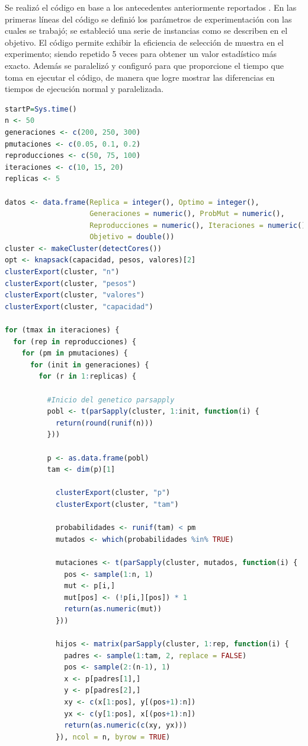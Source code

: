 \documentclass[12pt, letterpaper] {article}
\begin{document}
Se realizó el código en base a los antecedentes anteriormente reportados \cite{PGAM}. En las primeras líneas del c\'odigo se defini\'o los par\'ametros de experimentaci\'on con las cuales se trabajó; se estableció una serie de instancias como se describen en el objetivo. El código permite exhibir la eficiencia de selección de muestra en el experimento; siendo repetido 5 veces para obtener un valor estadístico más exacto. Además se paralelizó y configuró para que proporcione el tiempo que toma en ejecutar el código, de manera que logre mostrar las diferencias en tiempos de ejecución normal y paralelizada. 

\begin{lstlisting}[language=R]
startP=Sys.time()
n <- 50      
generaciones <- c(200, 250, 300)   
pmutaciones <- c(0.05, 0.1, 0.2)    
reproducciones <- c(50, 75, 100)   
iteraciones <- c(10, 15, 20)   
replicas <- 5 

datos <- data.frame(Replica = integer(), Optimo = integer(),
                    Generaciones = numeric(), ProbMut = numeric(),
                    Reproducciones = numeric(), Iteraciones = numeric(),
                    Objetivo = double())
cluster <- makeCluster(detectCores())
opt <- knapsack(capacidad, pesos, valores)[2]
clusterExport(cluster, "n")
clusterExport(cluster, "pesos")
clusterExport(cluster, "valores")
clusterExport(cluster, "capacidad")

for (tmax in iteraciones) {
  for (rep in reproducciones) {
    for (pm in pmutaciones) {
      for (init in generaciones) {
        for (r in 1:replicas) {
          
          #Inicio del genetico parsapply
          pobl <- t(parSapply(cluster, 1:init, function(i) {
            return(round(runif(n)))
          }))
          
          p <- as.data.frame(pobl)
          tam <- dim(p)[1]

            clusterExport(cluster, "p")
            clusterExport(cluster, "tam")
            
            probabilidades <- runif(tam) < pm
            mutados <- which(probabilidades %in% TRUE)
            
            mutaciones <- t(parSapply(cluster, mutados, function(i) {
              pos <- sample(1:n, 1)
              mut <- p[i,]
              mut[pos] <- (!p[i,][pos]) * 1
              return(as.numeric(mut))
            }))
            
            hijos <- matrix(parSapply(cluster, 1:rep, function(i) {
              padres <- sample(1:tam, 2, replace = FALSE)
              pos <- sample(2:(n-1), 1)
              x <- p[padres[1],]
              y <- p[padres[2],]
              xy <- c(x[1:pos], y[(pos+1):n])
              yx <- c(y[1:pos], x[(pos+1):n])
              return(as.numeric(c(xy, yx)))
            }), ncol = n, byrow = TRUE)
            

\end{lstlisting}
\end{document}
